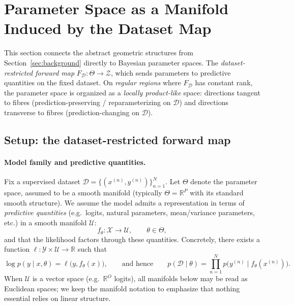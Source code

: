 \section{Parameter Space as a Manifold Induced by the Dataset Map}
\label{sec:parameter_space_manifold}

This section connects the abstract geometric structures from
Section~\ref{sec:background} directly to Bayesian parameter spaces.
The \emph{dataset-restricted forward map} $F_{\mathcal D}:\Theta \longrightarrow \mathcal Z$, which sends parameters to predictive quantities on the fixed dataset.
On \emph{regular regions} where $F_{\mathcal D}$ has constant rank,
the parameter space is organized as a \emph{locally product-like} space:
directions tangent to fibres (prediction-preserving / reparameterizing on $\mathcal D$)
and directions transverse to fibres (prediction-changing on $\mathcal D$).

\subsection{Setup: the dataset-restricted forward map}
\label{subsec:psetup_dataset_map}

\paragraph{Model family and predictive quantities.}
Fix a supervised dataset $\mathcal D=\{(x^{(n)},y^{(n)})\}_{n=1}^N$.
Let $\Theta$ denote the parameter space, assumed to be a smooth manifold
(typically $\Theta=\mathbb R^P$ with its standard smooth structure).
We assume the model admits a representation in terms of \emph{predictive quantities}
(e.g.\ logits, natural parameters, mean/variance parameters, etc.) in a smooth manifold
$\mathcal U$:
\[
f_\theta:\mathcal X \to \mathcal U,
\qquad \theta\in\Theta,
\]
and that the likelihood factors through these quantities. Concretely, there exists
a function $\ell:\mathcal Y\times \mathcal U\to\mathbb R$ such that
\[
\log p(y\mid x,\theta)=\ell\bigl(y, f_\theta(x)\bigr),
\qquad\text{and hence}\qquad
p(\mathcal D\mid\theta)=\prod_{n=1}^N p\bigl(y^{(n)}\mid f_\theta(x^{(n)})\bigr).
\]
When $\mathcal U$ is a vector space (e.g.\ $\mathbb R^O$ logits), all manifolds below may
be read as Euclidean spaces; we keep the manifold notation to emphasize that nothing
essential relies on linear structure.

